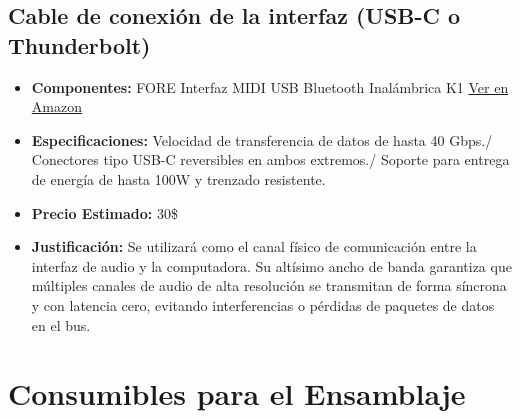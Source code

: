 \documentclass[12pt,a4paper]{article}
\begin{document}
\subsection{Cable de conexión de la interfaz (USB-C o Thunderbolt)}
\begin{itemize}
    \item \textbf{Componentes:} FORE Interfaz MIDI USB Bluetooth Inalámbrica K1
    \href{https://www.amazon.com/-/es/FORE-USB-OUT-MIDI-Convertidor/dp/B0FLXCH61M/ref=sr_1_8?__mk_es_US=%C3%85M%C3%85%C5%BD%C3%95%C3%91&crid=2MIQ355MNKXDH&dib=eyJ2IjoiMSJ9.f6XoakIu0Hh0BeAmeXOxUW-J0Gdk_Kp0A5ETQitKqczhLXM9tbmLwfxdx49XS6wmu0_-rLIn-umFdQQ2sYGWRMAVv5t_sbWwFqhzBhXL38Jf06rt5qCCsmhfXyVExSu6s12B6dkr-rDRv9_avZyNPyDs_lUPxx0b66dKX45kfr4Plti7tMzXSKVILj8JNi1xo3iNE1f4ZIuBrasKZ6jLxiXeVYtb5_0jkM6oOrgOft8.oXiUM8hj3t8-8I-2mFsOC3ffk72Ibkxi5oqHEm0p_-8&dib_tag=se&keywords=cable%2Bde%2Bconexi%C3%B3n%2Bde%2Bla%2Binterfaz&qid=1779460442&sprefix=cable%2Bde%2Bconexi%C3%B3n%2Bde%2Bla%2Binterfaz%2B%2Caps%2C136&sr=8-8&th=1}{Ver en Amazon}
    \item \textbf{Especificaciones:} Velocidad de transferencia de datos de hasta 40 Gbps./ Conectores tipo USB-C reversibles en ambos extremos./ Soporte para entrega de energía de hasta 100W y trenzado resistente.
    \item \textbf{Precio Estimado:} 30\$
    \item \textbf{Justificación:} Se utilizará como el canal físico de comunicación entre la interfaz de audio y la computadora. Su altísimo ancho de banda garantiza que múltiples canales de audio de alta resolución se transmitan de forma síncrona y con latencia cero, evitando interferencias o pérdidas de paquetes de datos en el bus.
\end{itemize}

\section{Consumibles para el Ensamblaje}
\end{document}
